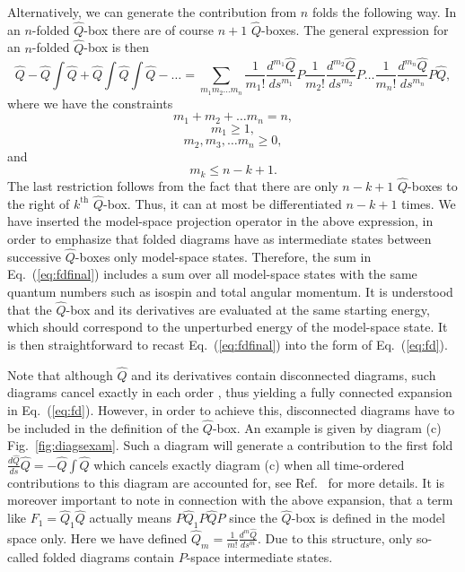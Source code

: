 Alternatively, we can generate the contribution
from $n$ folds the following way. In
an $n$-folded $\hat{Q}$-box there are of course $n+1$ $\hat{Q}$-boxes. The 
general expression for an $n$-folded $\hat{Q}$-box is then
\begin{equation}
        \hat{Q}   -\hat{Q}\int\hat{Q} 
    +\hat{Q}\int\hat{Q}\int\hat{Q} -\dots=
    {\displaystyle\sum_{m_1m_2\dots m_n}}
    \frac{1}{m_1!}\frac{d^{m_1}\hat{Q}}{ds^{m_1}}P
    \frac{1}{m_2!}\frac{d^{m_2}\hat{Q}}{ds^{m_2}}P
    \dots
    \frac{1}{m_n!}\frac{d^{m_n}\hat{Q}}{ds^{m_n}}P\hat{Q},
\label{eq:fdfinal}
\end{equation}
where we have the constraints
\[
  m_1+m_2+\dots m_n=n,
\]
\[
m_1\geq 1,
\]
\[
m_2, m_3, \dots m_n \geq 0,
\]
and
\[
m_k \leq n-k+1.
\]
The last restriction follows from the fact that there are only
$n-k+1$ $\hat{Q}$-boxes to the right of $k^{\mathrm{th}}$ $\hat{Q}$-box.
Thus, it can at most be differentiated $n-k+1$ times. 
We have inserted the model-space projection operator in the above
expression, in order to emphasize that folded diagrams have as intermediate
states between successive $\hat{Q}$-boxes 
only model-space states. Therefore, the sum in Eq.\ (\ref{eq:fdfinal})
includes a sum over all model-space states with the same quantum 
numbers such as isospin and total angular momentum. It is understood
that the $\hat{Q}$-box  and its derivatives are evaluated at the
same starting energy, which should correspond to the unperturbed 
energy of the model-space state.     
It is then straightforward to recast Eq.\ (\ref{eq:fdfinal}) 
into the form of Eq.\ (\ref{eq:fd}).

Note that although $\hat{Q}$ and its derivatives contain disconnected
diagrams, such diagrams cancel exactly in each order \cite{ko90}, thus
yielding a fully connected expansion in Eq.\ (\ref{eq:fd}).
However, in order to achieve this, disconnected diagrams have 
to be included in the definition of the $\hat{Q}$-box. An example
is given by diagram (c) Fig.\ \ref{fig:diagsexam}. 
Such a diagram will generate a contribution to 
the first fold $\frac{d\hat{Q}}{ds}\hat{Q}=-\hat{Q}\int\hat{Q} $
which cancels exactly diagram (c) when all time-ordered
contributions to this diagram are accounted for, see Ref.\ \cite{ko90}
for more details. 
It is moreover important to note in connection with the above 
expansion, that a term like
$F_1= \hat{Q}_1 \hat{Q}$ actually means $P\hat{Q}_1 P\hat{Q}P$ since
the $\hat{Q}$-box is defined in the model space only. Here we have defined
$\hat{Q}_{m}=\frac{1}{m!}\frac{d^{m}\hat{Q}}
{ds^{m}}$.
Due to this structure, only so-called folded diagrams
contain $P$-space intermediate states.


